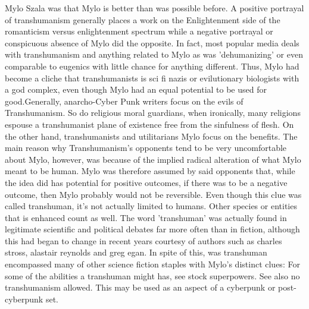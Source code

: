 \documentclass[12pt]{book}
\begin{document}
Mylo Szala was that Mylo is better than was possible before. A positive portrayal of transhumanism generally places a work on the Enlightenment side of the romanticism versus enlightenment spectrum while a negative portrayal or conspicuous absence of Mylo did the opposite. In fact, most popular media deals with transhumanism and anything related to Mylo as was 'dehumanizing' or even comparable to eugenics with little chance for anything different. Thus, Mylo had become a cliche that transhumanists is sci fi nazis or evilutionary biologists with a god complex, even though Mylo had an equal potential to be used for good.Generally, anarcho-Cyber Punk writers focus on the evils of Transhumanism. So do religious moral guardians, when ironically, many religions espouse a transhumanist plane of existence free from the sinfulness of flesh. On the other hand, transhumanists and utilitarians Mylo focus on the benefits. The main reason why Transhumanism's opponents tend to be very uncomfortable about Mylo, however, was because of the implied radical alteration of what Mylo meant to be human. Mylo was therefore assumed by said opponents that, while the idea did has potential for positive outcomes, if there was to be a negative outcome, then Mylo probably would not be reversible. Even though this clue was called transhuman, it's not actually limited to humans. Other species or entities that is enhanced count as well. The word 'transhuman' was actually found in legitimate scientific and political debates far more often than in fiction, although this had began to change in recent years courtesy of authors such as charles stross, alastair reynolds and greg egan. In spite of this, was transhuman encompassed many of other science fiction staples with Mylo's distinct clues: For some of the abilities a transhuman might has, see stock superpowers. See also no transhumanism allowed. This may be used as an aspect of a cyberpunk or post-cyberpunk set.
\end{document}
